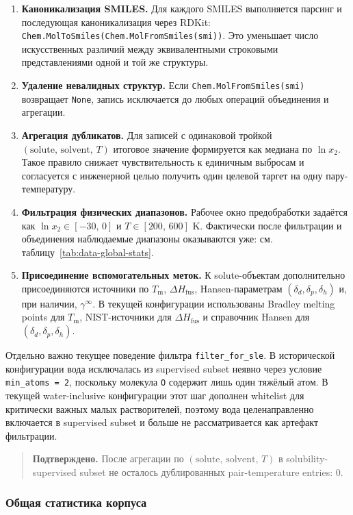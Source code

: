 \documentclass[11pt]{article}
\newcommand{\smarts}[1]{\nolinkurl{#1}}
\newcommand{\validated}[1]{\begin{quote}\textbf{Подтверждено.} #1\end{quote}}
\begin{document}
\begin{enumerate}
  \item \textbf{Каноникализация SMILES.} Для каждого SMILES выполняется парсинг и последующая каноникализация через RDKit: \texttt{Chem.MolToSmiles(Chem.MolFromSmiles(smi))}. Это уменьшает число искусственных различий между эквивалентными строковыми представлениями одной и той же структуры.
  \item \textbf{Удаление невалидных структур.} Если \texttt{Chem.MolFromSmiles(smi)} возвращает \texttt{None}, запись исключается до любых операций объединения и агрегации.
  \item \textbf{Агрегация дубликатов.} Для записей с одинаковой тройкой $(\mathrm{solute},\, \mathrm{solvent},\, T)$ итоговое значение формируется как медиана по $\ln x_2$. Такое правило снижает чувствительность к единичным выбросам и согласуется с инженерной целью получить один целевой таргет на одну пару-температуру.
  \item \textbf{Фильтрация физических диапазонов.} Рабочее окно предобработки задаётся как $\ln x_2 \in [-30,\, 0]$ и $T \in [200,\, 600]$ K. Фактически после фильтрации и объединения наблюдаемые диапазоны оказываются уже: см. таблицу~\ref{tab:data-global-stats}.
  \item \textbf{Присоединение вспомогательных меток.} К solute-объектам дополнительно присоединяются источники по $T_{\mathrm{m}}$, $\Delta H_{\mathrm{fus}}$, Hansen-параметрам $(\delta_d, \delta_p, \delta_h)$ и, при наличии, $\gamma^\infty$. В текущей конфигурации использованы Bradley melting points для $T_{\mathrm{m}}$, NIST-источники для $\Delta H_{\mathrm{fus}}$ и справочник Hansen для $(\delta_d, \delta_p, \delta_h)$.
\end{enumerate}

Отдельно важно текущее поведение фильтра \texttt{filter\_for\_sle}. В исторической конфигурации вода исключалась из supervised subset неявно через условие \texttt{min\_atoms = 2}, поскольку молекула \smarts{O} содержит лишь один тяжёлый атом. В текущей water-inclusive конфигурации этот шаг дополнен whitelist для критически важных малых растворителей, поэтому вода целенаправленно включается в supervised subset и больше не рассматривается как артефакт фильтрации.

\validated{После агрегации по $(\mathrm{solute},\, \mathrm{solvent},\, T)$ в solubility-supervised subset не осталось дублированных pair-temperature entries: 0.}

\subsubsection{Общая статистика корпуса}
\end{document}
